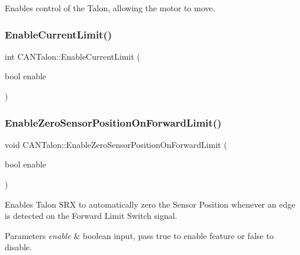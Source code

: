Enables control of the Talon, allowing the motor to move. \mbox{\label{class_c_a_n_talon_a7a69f5ce972fe26739c918ef3ba37dd3}} 
\subsubsection{\texorpdfstring{Enable\+Current\+Limit()}{EnableCurrentLimit()}}
{\footnotesize\ttfamily int C\+A\+N\+Talon\+::\+Enable\+Current\+Limit (\begin{DoxyParamCaption}\item[{bool}]{enable }\end{DoxyParamCaption})}

\mbox{\label{class_c_a_n_talon_a2ab734332c2c8f1ff2a1db635058cfe4}} 
\subsubsection{\texorpdfstring{Enable\+Zero\+Sensor\+Position\+On\+Forward\+Limit()}{EnableZeroSensorPositionOnForwardLimit()}}
{\footnotesize\ttfamily void C\+A\+N\+Talon\+::\+Enable\+Zero\+Sensor\+Position\+On\+Forward\+Limit (\begin{DoxyParamCaption}\item[{bool}]{enable }\end{DoxyParamCaption})}

Enables Talon S\+RX to automatically zero the Sensor Position whenever an edge is detected on the Forward Limit Switch signal.


\begin{DoxyParams}{Parameters}
{\em enable} & boolean input, pass true to enable feature or false to disable. \\
\hline
\end{DoxyParams}
\mbox{\label{class_c_a_n_talon_a9a7de9cdd37714741fe25c30ed53e071}} 
